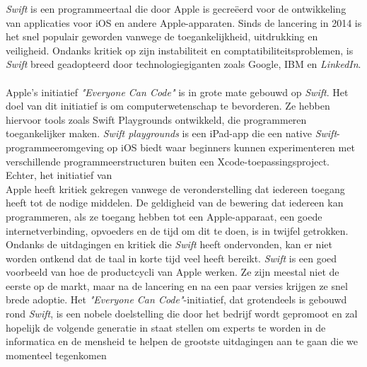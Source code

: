 \textit{Swift} is een programmeertaal die door Apple is gecreëerd voor de ontwikkeling van applicaties voor iOS en andere Apple-apparaten. Sinds de lancering in 2014 is het snel populair geworden vanwege de toegankelijkheid, uitdrukking en veiligheid. Ondanks kritiek op zijn instabiliteit en comptatibiliteitsproblemen, is \textit{Swift} breed geadopteerd door technologiegiganten zoals Google, IBM en \textit{LinkedIn}. \\ \\
Apple's initiatief \textit{"Everyone Can Code"}  is in grote mate gebouwd op \textit{Swift}. Het doel van dit initiatief is om computerwetenschap te bevorderen. Ze hebben hiervoor tools zoals Swift Playgrounds ontwikkeld, die programmeren toegankelijker maken. \textit{Swift playgrounds} is een iPad-app die een native \textit{Swift}-programmeeromgeving op iOS biedt waar beginners kunnen experimenteren met verschillende programmeerstructuren buiten een Xcode-toepassingsproject.
Echter, het initiatief van \\Apple heeft kritiek gekregen vanwege de veronderstelling dat iedereen toegang heeft tot de nodige middelen. De geldigheid van de bewering dat iedereen kan programmeren, als ze toegang hebben tot een Apple-apparaat, een goede internetverbinding, opvoeders en de tijd om dit te doen, is in twijfel getrokken.  
Ondanks de uitdagingen en kritiek die \textit{Swift} heeft ondervonden, kan er niet  worden ontkend dat de taal in korte tijd veel heeft bereikt. \textit{Swift} is een goed voorbeeld van hoe de productcycli van Apple werken. Ze zijn meestal niet de eerste op de markt, maar na de lancering en na een paar versies krijgen ze snel brede  adoptie. Het \textit{"Everyone Can Code"}-initiatief, dat grotendeels is gebouwd rond \textit{Swift}, is een nobele doelstelling die door het bedrijf wordt gepromoot en zal  hopelijk de volgende generatie in staat stellen om experts te worden in de informatica en de mensheid te helpen de grootste uitdagingen aan te gaan die we momenteel tegenkomen \autocite{Weninger2020}  

